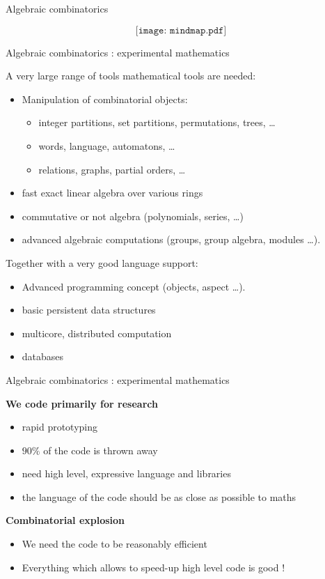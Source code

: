 \documentclass[compress,11pt]{beamer}
\begin{document}
\begin{frame}{Algebraic combinatorics}

\[\texttt{[image: mindmap.pdf]}\]
\end{frame}
\begin{frame}{Algebraic combinatorics : experimental mathematics}

A very large range of tools mathematical tools are needed:
\begin{itemize}
\item Manipulation of combinatorial objects:
  \begin{itemize}
  \item integer partitions, set partitions, permutations, trees, \dots
  \item words, language, automatons, \dots
  \item relations, graphs, partial orders, \dots
  \end{itemize}
\item fast exact linear algebra over various rings
\item commutative or not algebra (polynomials, series, \dots)
\item advanced algebraic computations (groups, group algebra, modules \dots).
\end{itemize}
\bigskip\pause

Together with a very good language support:
\begin{itemize}
\item Advanced programming concept (objects, aspect \dots).
\item basic persistent data structures
\item multicore, distributed computation
\item databases
\end{itemize}
\end{frame}

\begin{frame}{Algebraic combinatorics : experimental mathematics}

\textbf{\Large We code primarily for research}
\begin{itemize}
\item rapid prototyping
\item $90\%$ of the code is thrown away
\bigskip\pause
\item need high level, expressive language and libraries
\item the language of the code should be as close as possible to maths
\end{itemize}
\bigskip\pause
\textbf{\Large Combinatorial explosion}
\begin{itemize}
\item We need the code to be reasonably efficient
\item Everything which allows to speed-up high level code is good !
\end{itemize}
\end{frame}
\end{document}
